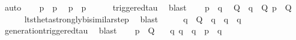 \begin{isabellebody}
\ auto\isanewline
\ \ \isamarkupfalse%
\ {\isacartoucheopen}p\ {\isasymlongmapsto}{\isasymtau}\ p{\isacharprime}{\kern0pt}{\isacartoucheclose}\ \isamarkupfalse%
\ {\isacartoucheopen}{\isasymtheta}{\isacharparenleft}{\kern0pt}p{\isacharparenright}{\kern0pt}\ {\isasymlongmapsto}\isactrlsup {\isasymtheta}{\isasymtau}\ {\isasymtheta}{\isacharparenleft}{\kern0pt}p{\isacharprime}{\kern0pt}{\isacharparenright}{\kern0pt}{\isacartoucheclose}\isanewline
\ \ \ \ \isamarkupfalse%
\ triggered{\isacharunderscore}{\kern0pt}tau\ \isamarkupfalse%
\ blast\isanewline
\ \ \isamarkupfalse%
\ {\isacartoucheopen}{\isasymtheta}{\isacharparenleft}{\kern0pt}p{\isacharparenright}{\kern0pt}\ {\isasymleftrightarrow}\ {\isasymtheta}{\isacharparenleft}{\kern0pt}q{\isacharparenright}{\kern0pt}{\isacartoucheclose}\ \isamarkupfalse%
\ Q{\isacharprime}{\kern0pt}\ \ {\isacartoucheopen}{\isasymtheta}{\isacharparenleft}{\kern0pt}q{\isacharparenright}{\kern0pt}\ {\isasymlongmapsto}\isactrlsup {\isasymtheta}{\isasymtau}\ Q{\isacharprime}{\kern0pt}{\isacartoucheclose}\ {\isacartoucheopen}{\isasymtheta}{\isacharparenleft}{\kern0pt}p{\isacharprime}{\kern0pt}{\isacharparenright}{\kern0pt}\ {\isasymleftrightarrow}\ Q{\isacharprime}{\kern0pt}{\isacartoucheclose}\isanewline
\ \ \ \ \isamarkupfalse%
\ lts{\isacharunderscore}{\kern0pt}theta{\isachardot}{\kern0pt}strongly{\isacharunderscore}{\kern0pt}bisimilar{\isacharunderscore}{\kern0pt}step\ \isamarkupfalse%
\ blast\isanewline
\ \ \isamarkupfalse%
\ \isamarkupfalse%
\ q{\isacharprime}{\kern0pt}\ \ {\isacartoucheopen}Q{\isacharprime}{\kern0pt}\ {\isacharequal}{\kern0pt}\ {\isasymtheta}{\isacharparenleft}{\kern0pt}q{\isacharprime}{\kern0pt}{\isacharparenright}{\kern0pt}\ {\isasymand}\ q\ {\isasymlongmapsto}{\isasymtau}\ q{\isacharprime}{\kern0pt}{\isacartoucheclose}\isanewline
\ \ \ \ \isamarkupfalse%
\ generation{\isacharunderscore}{\kern0pt}triggered{\isacharunderscore}{\kern0pt}tau\ \isamarkupfalse%
\ blast\isanewline
\ \ \isamarkupfalse%
\ {\isacartoucheopen}{\isasymtheta}{\isacharparenleft}{\kern0pt}p{\isacharprime}{\kern0pt}{\isacharparenright}{\kern0pt}\ {\isasymleftrightarrow}\ Q{\isacharprime}{\kern0pt}{\isacartoucheclose}\ \isamarkupfalse%
\ {\isacartoucheopen}{\isasymexists}\ q{\isacharprime}{\kern0pt}{\isachardot}{\kern0pt}\ q\ {\isasymlongmapsto}{\isasymtau}\ q{\isacharprime}{\kern0pt}\ {\isasymand}\ {\isasymtheta}{\isacharparenleft}{\kern0pt}p{\isacharprime}{\kern0pt}{\isacharparenright}{\kern0pt}\ {\isasymleftrightarrow}\ {\isasymtheta}{\isacharparenleft}{\kern0pt}q{\isacharprime}{\kern0pt}{\isacharparenright}{\kern0pt}{\isacartoucheclose}\ \isamarkupfalse%

\end{isabellebody}
